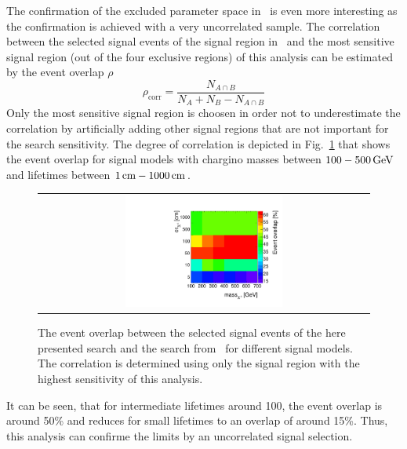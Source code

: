 The confirmation of the excluded parameter space in~\cite{bib:CMS:DT_8TeV} is even more interesting as the confirmation is achieved with a very  uncorrelated sample.
The correlation between the selected signal events of the signal region in~\cite{bib:CMS:DT_8TeV} and the most sensitive signal region (out of the four exclusive regions) of this analysis can be estimated by the event overlap $\rho$
\begin{equation*}
\rho_{\text{corr}} = \frac{N_{A\cap B}}{N_A + N_B - N_{A \cap B}}
\end{equation*}
Only the most sensitive signal region is choosen in order not to underestimate the correlation by artificially adding other signal regions that are not important for the search sensitivity.
The degree of correlation is depicted in Fig.~\ref{fig:AnalysisOverlap} that shows the event overlap for signal models with chargino masses between $100-500\,\text{Ge}\kern-0.06667em\text{V}$ and lifetimes between $1\,\text{cm}-1000\,\text{cm}$.
\begin{figure}[!t]
  \centering 
  \begin{tabular}{c}
    \includegraphics[width=0.49\textwidth]{figures/analysis/Interpretation/AnalysisOverlap.pdf}  
  \end{tabular}
  \caption{The event overlap between the selected signal events of the here presented search and the search from~\cite{bib:CMS:DT_8TeV} for different signal models.
          The correlation is determined using only the signal region with the highest sensitivity of this analysis.}
  \label{fig:AnalysisOverlap}
\end{figure} 
It can be seen, that for intermediate lifetimes around 100\cm, the event overlap is around 50\% and reduces for small lifetimes to an overlap of around 15\%.
Thus, this analysis can confirme the limits by an uncorrelated signal selection.



\FloatBarrier
